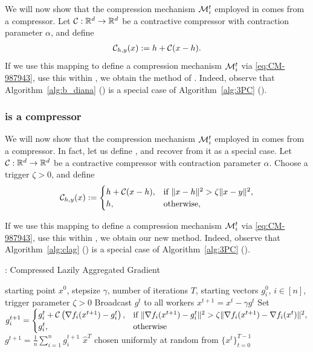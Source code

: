 \documentclass[nohyperref]{article}
\theoremstyle{plain}
\theoremstyle{definition}
\theoremstyle{remark}
\begin{document}
We will now show that the compression mechanism ${\cal M}_i^t$ employed in   comes from a  compressor. Let $\mathcal{C}:\mathbb R^d\to \mathbb R^d$ be a contractive compressor with contraction parameter $\alpha$, and define
	\begin{eqnarray}
	\mathcal{C}_{h,y}(x) := h + \mathcal{C}(x - h).  \label{eq:---=08}
	\end{eqnarray}
If we use this mapping to define a compression mechanism ${\cal M}_i^t$ via \eqref{eq:CM-987943}, use this within , 
we obtain the  method of \citet{EF21}. Indeed, observe that Algorithm~\ref{alg:b_diana} () is a special case of Algorithm~\ref{alg:3PC} (). 

\subsubsection{ is a  compressor}

We will now show that the compression mechanism ${\cal M}_i^t$ employed in  comes from a  compressor. In fact, let us define , and recover  from it as a special case. Let $\mathcal{C}:\mathbb R^d\to \mathbb R^d$ be a contractive compressor with contraction parameter $\alpha$. Choose a trigger $\zeta>0$, and define
	\begin{eqnarray}
	\mathcal{C}_{h,y}(x) := \begin{cases} h + \mathcal{C}(x - h),& \text{if } \|x- h\|^2 > \zeta \|x - y\|^2,\\ h,& \text{otherwise,} \end{cases}  \label{eq:clag_98f9d8}
	\end{eqnarray}

If we use this mapping to define a compression mechanism ${\cal M}_i^t$ via \eqref{eq:CM-987943}, use this within , 
we obtain our new  method. Indeed, observe that Algorithm~\ref{alg:clag} () is a special case of Algorithm~\ref{alg:3PC} (). 

\begin{algorithm}[!h]
   \caption{: Compressed Lazily Aggregated Gradient}\label{alg:clag}
\begin{algorithmic}[1]
    starting point $x^0$, stepsize $\gamma$, number of iterations $T$, starting vectors $g_i^0$, $i \in [n]$, trigger parameter $\zeta > 0$
   \STATE Broadcast $g^t$ to all workers
   \STATE $x^{t+1} = x^t - \gamma g^t$
   \STATE Set $g_i^{t+1} = \begin{cases} g_i^t + \mathcal{C}\left(\nabla f_i(x^{t+1}) - g_i^t\right),& \text{if } \|\nabla f_i(x^{t+1}) - g_i^t\|^2 > \zeta \|\nabla f_i(x^{t+1}) - \nabla f_i(x^t)\|^2,\\ g_i^t,& \text{otherwise} \end{cases}$ 
   \ENDFOR
   \STATE $g^{t+1} = \tfrac{1}{n}\sum_{i=1}^ng_i^{t+1}$
   \ENDFOR
    $\hat x^T$ chosen uniformly at random from $\{x^t\}_{t=0}^{T-1}$
\end{algorithmic}
\end{algorithm}
\end{document}
